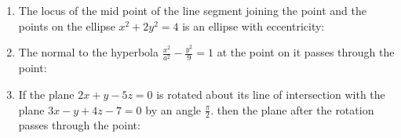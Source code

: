 \documentclass[journal,12pt,onecolumn]{IEEEtran}
\theoremstyle{remark}
\begin{document}
\begin{enumerate}
\hfill{}
\begin{enumerate}
\end{enumerate}

\item The locus of the mid point of the line segment joining the point  and the points on the ellipse $x^2+2y^2=4$ is an ellipse with eccentricity:

\hfill{}
\begin{enumerate}
\end{enumerate}

\item The normal to the hyperbola $\frac{x^2}{a^2}-\frac{y^2}{9}=1$ at the point  on it passes through the point:

\hfill{}
\begin{enumerate}
\end{enumerate}

\item If the plane $2x+y-5z=0$ is rotated about its line of intersection with the plane $3x-y+4z-7=0$ by an angle $\frac{\pi}{2}$. then the plane after the rotation passes through the point:

\hfill{}
\begin{enumerate}
\end{enumerate}


\end{enumerate}
\end{document}
